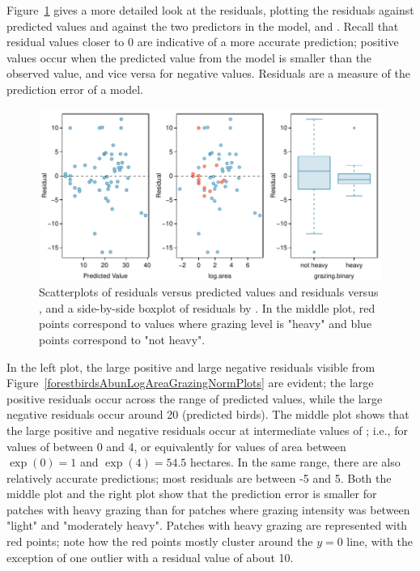 Figure~\ref{forestbirdsAbunLogAreaGrazingResidPlots} gives a more detailed look at the residuals, plotting the residuals against predicted values and against the two predictors in the model,  and . Recall that residual values closer to 0 are indicative of a more accurate prediction; positive values occur when the predicted value from the model is smaller than the observed value, and vice versa for negative values. Residuals are a measure of the prediction error of a model.

\begin{figure}[h]
	\centering
	\includegraphics[width=\textwidth]
	{ch_multiple_linear_regression_oi_biostat/figures/forestbirdsAbunLogAreaGrazingResidPlots/forestbirdsAbunLogAreaGrazingResidPlots.pdf}
	\caption{Scatterplots of residuals versus predicted values and residuals versus , and a side-by-side boxplot of residuals by . In the middle plot, red points correspond to values where grazing level is "heavy" and blue points correspond to "not heavy".}
	\label{forestbirdsAbunLogAreaGrazingResidPlots}
\end{figure}

\textD{\newpage}

In the left plot, the large positive and large negative residuals visible from Figure~\ref{forestbirdsAbunLogAreaGrazingNormPlots} are evident; the large positive residuals occur across the range of predicted values, while the large negative residuals occur around 20 (predicted birds). The middle plot shows that the large positive and negative residuals occur at intermediate values of ; i.e., for values of  between 0 and 4, or equivalently for values of area between $\exp(0) = 1$ and $\exp(4) = 54.5$ hectares. In the same range, there are also relatively accurate predictions; most residuals are between -5 and 5. Both the middle plot and the right plot show that the prediction error is smaller for patches with heavy grazing than for patches where grazing intensity was between "light" and "moderately heavy". Patches with heavy grazing are represented with red points; note how the red points mostly cluster around the $y = 0$ line, with the exception of one outlier with a residual value of about 10.

